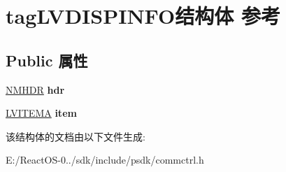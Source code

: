 \hypertarget{structtag_l_v_d_i_s_p_i_n_f_o}{}\section{tag\+L\+V\+D\+I\+S\+P\+I\+N\+F\+O结构体 参考}
\label{structtag_l_v_d_i_s_p_i_n_f_o}
\subsection*{Public 属性}
\begin{DoxyCompactItemize}
\item 
\mbox{\label{structtag_l_v_d_i_s_p_i_n_f_o_a6cc14533c07e861db211636939e240e6}} 
\hyperlink{structtag_n_m_h_d_r}{N\+M\+H\+DR} {\bfseries hdr}
\item 
\mbox{\label{structtag_l_v_d_i_s_p_i_n_f_o_a9142daafa9c049a83163dd7f35fae1c2}} 
\hyperlink{structtag_l_v_i_t_e_m_a}{L\+V\+I\+T\+E\+MA} {\bfseries item}
\end{DoxyCompactItemize}


该结构体的文档由以下文件生成\+:\begin{DoxyCompactItemize}
\item 
E\+:/\+React\+O\+S-\/0../sdk/include/psdk/commctrl.\+h\end{DoxyCompactItemize}
